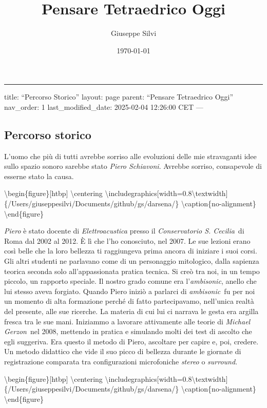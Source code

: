 \documentclass[a4paper,11pt]{article}
\title{Pensare Tetraedrico Oggi}
\author{Giuseppe Silvi}
\date{\today}
\begin{document}
\maketitle

\begin{center}
\rule{3in}{0.4pt}
\end{center}
title: ``Percorso Storico''
layout: page
parent: ``Pensare Tetraedrico Oggi''
nav\_order: 1
last\_modified\_date: 2025-02-04 12:26:00 CET
---

\subsection{Percorso storico}\hypertarget{percorso-storico}{}\label{percorso-storico}

L'uomo che più di tutti avrebbe sorriso alle evoluzioni delle mie
stravaganti idee sullo spazio sonoro sarebbe stato \emph{Piero Schiavoni}.
Avrebbe sorriso, consapevole di esserne stato la causa.

\textbackslash{}begin\{figure\}{[}htbp{]}
  \textbackslash{}centering
  \textbackslash{}includegraphics{[}width=0.8\textbackslash{}textwidth{]}\{/Users/giuseppesilvi/Documents/github/gs/darsena/\}
  \textbackslash{}caption\{no-alignment\}
\textbackslash{}end\{figure\}

\emph{Piero} è stato docente di \emph{Elettroacustica} presso il \emph{Conservatorio S.
Cecilia} di Roma dal 2002 al 2012. È lì che l'ho conosciuto, nel 2007.
Le sue lezioni erano così belle che la loro bellezza ti raggiungeva
prima ancora di iniziare i suoi corsi. Gli altri studenti ne parlavano
come di un personaggio mitologico, dalla sapienza teorica seconda solo
all'appassionata pratica tecnica. Si creò tra noi, in un tempo piccolo,
un rapporto speciale. Il nostro grado comune era l'\emph{ambisonic}, anello
che lui stesso aveva forgiato. Quando Piero iniziò a parlarci di
\emph{ambisonic} fu per noi un momento di alta formazione perché di fatto
partecipavamo, nell'unica realtà del presente, alle sue ricerche. La
materia di cui lui ci narrava le gesta era argilla fresca tra le sue
mani. Iniziammo a lavorare attivamente alle teorie di \emph{Michael
Gerzon} nel 2008, mettendo in pratica e simulando molti dei test di
ascolto che egli suggeriva. Era questo il metodo di Piero, ascoltare per
capire e, poi, credere. Un metodo didattico che vide il suo picco di
bellezza durante le giornate di registrazione comparata tra
configurazioni microfoniche \emph{stereo} o \emph{surround}.

\textbackslash{}begin\{figure\}{[}htbp{]}
  \textbackslash{}centering
  \textbackslash{}includegraphics{[}width=0.8\textbackslash{}textwidth{]}\{/Users/giuseppesilvi/Documents/github/gs/darsena/\}
  \textbackslash{}caption\{no-alignment\}
\textbackslash{}end\{figure\}
\end{document}
